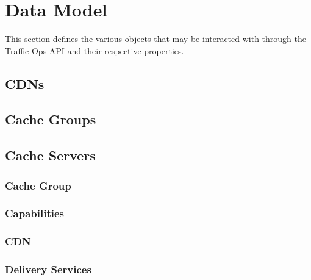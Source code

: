 %
%

\section{Data Model\label{sec:data-model}}
This section defines the various objects that may be interacted with through the Traffic Ops API and their respective properties.

\subsection{CDNs}

\subsection{Cache Groups}

\subsection{Cache Servers}

\subsubsection{Cache Group}

\subsubsection{Capabilities}

\subsubsection{CDN}

\subsubsection{Delivery Services}


